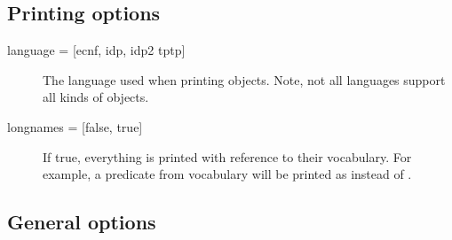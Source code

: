 \subsection{Printing options}
\begin{description}
	\item[{language = [ecnf, idp, idp2 %
				tptp]}] The language used when printing objects. Note, not all languages support all kinds of objects.
	\item[{longnames = [false, true]}] If true, everything is printed with reference to their vocabulary.  For example, a predicate  from vocabulary  will be printed as  instead of .
\end{description}

\subsection{General options}

